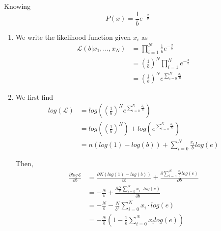 \documentclass{article}
\begin{document}
\begin{enumerate}
        Knowing
        \begin{equation*}
            P(x) = \frac{1}{b}e^{-\frac{x}{b}}
        \end{equation*}
        \begin{enumerate}
            \item %
                We write the likelihood function given \(x_i\) as
                \begin{align*}
                \mathcal{L}(b|x_1,\hdots,x_N) 
                &= \prod_{i = 1}^N \frac{1}{b}e^{-\frac{x}{b}}\\
                &= \left(\frac{1}{b}\right)^N \prod_{i = 1}^N e^{-\frac{x}{b}}\\
                &= \left(\frac{1}{b}\right)^N e^{\sum_{i=0}^N \frac{x_i}{b}}
                \end{align*}

            \item %
                We first find
                \begin{align*}
                log(\mathcal{L}) 
                    &= log\left(\left(\frac{1}{b}\right)^N e^{\sum_{i=0}^N 
                        \frac{x_i}{b}}\right)\\
                    &= log\left(\left(\frac{1}{b}\right)^N\right) + 
                        log\left(e^{\sum_{i=0}^N \frac{x_i}{b}}\right)\\
                    &= n(log(1) - log(b)) + \sum_{i=0}^N \frac{x_i}{b}log(e)
                \end{align*}

                Then,
                \begin{align*}
                    \frac{\partial log \mathcal{L}}{\partial b}
                    &= \frac{\partial N(log(1) - log(b))}{\partial b} + 
                        \frac{\partial \sum_{i=0}^N 
                        \frac{x_i}{b}log(e)}{\partial b}\\
                    &= -\frac{N}{b} + \frac{\partial \frac{N}{b}
                        \sum_{i=0}^N x_i\cdot log(e)}{\partial b}\\
                    &= -\frac{N}{b} - \frac{N}{b^2}\sum_{i=0}^N x_i\cdot 
                        log(e)\\
                    &= -\frac{N}{b}\left(1-\frac{1}{b}\sum_{i=0}^N x_i 
                        log(e)\right)
                \end{align*}


\end{enumerate}
\end{enumerate}
\end{document}
